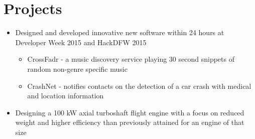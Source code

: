 \documentclass[11pt, letterpaper]{article}
\begin{document}

\section*{Projects}
\begin{itemize}
\item Designed and developed innovative new software within 24 hours at Developer Week 2015 and HackDFW 2015
	\begin{itemize}
	\item CrossFadr - a music discovery service playing 30 second snippets of random non-genre specific music
	\item CrashNet - notifies contacts on the detection of a car crash with medical and location information
	\end{itemize}
\item Designing a 100 kW axial turboshaft flight engine with a focus on reduced weight and higher efficiency than previously attained for an engine of that size
\end{itemize}
\end{document}
